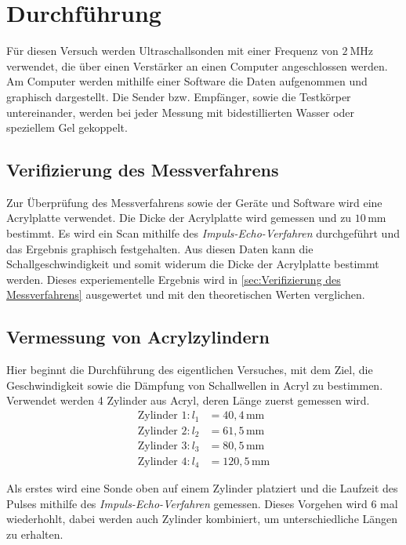 \section{Durchführung}
\label{sec:Durchführung}
Für diesen Versuch werden Ultraschallsonden mit einer Frequenz von $\qty{2}{\mega\hertz}$ verwendet,
die über einen Verstärker an einen Computer angeschlossen werden.
Am Computer werden mithilfe einer Software die Daten aufgenommen und graphisch dargestellt.
Die Sender bzw. Empfänger, sowie die Testkörper untereinander, werden bei jeder Messung mit bidestillierten Wasser oder
speziellem Gel gekoppelt.

\subsection{Verifizierung des Messverfahrens}

Zur Überprüfung des Messverfahrens sowie der Geräte und Software wird eine Acrylplatte verwendet.
Die Dicke der Acrylplatte wird gemessen und zu $10\,\unit{\milli\metre}$ bestimmt.
Es wird ein Scan mithilfe des \textit{Impuls-Echo-Verfahren} durchgeführt und das Ergebnis graphisch festgehalten.
Aus diesen Daten kann die Schallgeschwindigkeit und somit widerum die Dicke der Acrylplatte bestimmt werden.
Dieses experiementelle Ergebnis wird in \ref{sec:Verifizierung des Messverfahrens} ausgewertet
und mit den theoretischen Werten verglichen.

\subsection{Vermessung von Acrylzylindern}

Hier beginnt die Durchführung des eigentlichen Versuches, mit dem Ziel, die Geschwindigkeit sowie die Dämpfung
von Schallwellen in Acryl zu bestimmen.
Verwendet werden 4 Zylinder aus Acryl, deren Länge zuerst gemessen wird.
\begin{align*}
    \text{Zylinder 1:}\,l_1&=40,4\,\unit{\milli\metre} \\
    \text{Zylinder 2:}\,l_2&=61,5\,\unit{\milli\metre} \\
    \text{Zylinder 3:}\,l_3&=80,5\,\unit{\milli\metre} \\
    \text{Zylinder 4:}\,l_4&=120,5\,\unit{\milli\metre}
\end{align*}

Als erstes wird eine Sonde oben auf einem Zylinder platziert und die Laufzeit des Pulses mithilfe des \textit{Impuls-Echo-Verfahren}
gemessen. Dieses Vorgehen wird 6 mal wiederhohlt, dabei werden auch Zylinder kombiniert, um unterschiedliche Längen zu erhalten.

